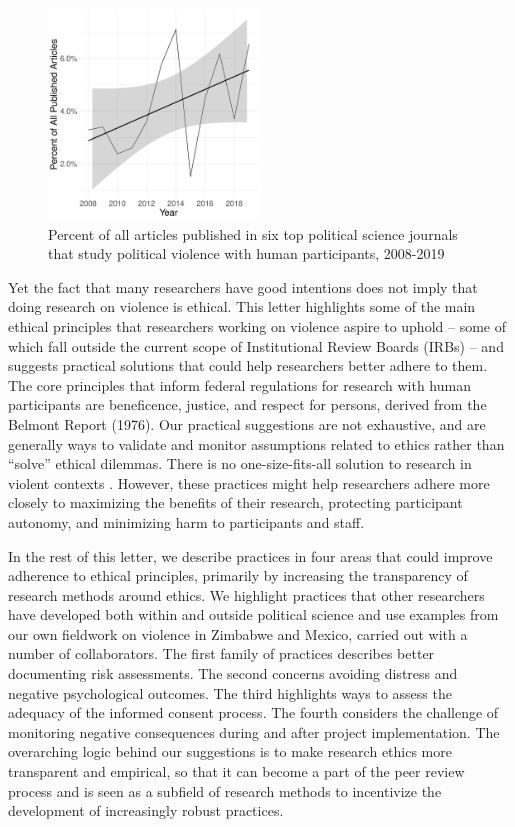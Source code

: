 \documentclass[
  journal=psrm,
  manuscript=research-note,  %
  year=2022,
  volume=6,
]{cup-journal}
\begin{document}
\begin{figure}[hbt!]
    \centering
    \includegraphics[width=0.5\textwidth]{ViolPct_Year.pdf}
    \caption{Percent of all articles published in six top political science journals that study political violence with human participants, 2008-2019}
    \label{fig:pct_violence}
\end{figure}

Yet the fact that many researchers have good intentions does not imply that doing research on violence is ethical. This letter highlights some of the main ethical principles that researchers working on violence aspire to uphold -- some of which fall outside the current scope of Institutional Review Boards (IRBs) -- and suggests practical solutions that could help researchers better adhere to them. The core principles that inform federal regulations for research with human participants are beneficence, justice, and respect for persons, derived from the Belmont Report (1976). Our practical suggestions are not exhaustive, and are generally ways to validate and monitor assumptions related to ethics rather than ``solve'' ethical dilemmas. There is no one-size-fits-all solution to research in violent contexts \citep{wood2006ethical}. However, these practices might help researchers adhere more closely to maximizing the benefits of their research, protecting participant autonomy, and minimizing harm to participants and staff. 

In the rest of this letter, we describe practices in four areas that could improve adherence to ethical principles, primarily by increasing the transparency of research methods around ethics. We highlight practices that other researchers have developed both within and outside political science and use examples from our own fieldwork on violence in Zimbabwe and Mexico, carried out with a number of collaborators. 
The first family of practices describes better documenting risk assessments. The second concerns avoiding distress and negative psychological outcomes. The third highlights ways to assess the adequacy of the informed consent process. The fourth considers the challenge of monitoring negative consequences during and after project implementation. The overarching logic behind our suggestions is to make research ethics more transparent and empirical, so that it can become a part of the peer review process and is seen as a subfield of research methods to incentivize the development of increasingly robust practices.






\printbibliography

\appendix


\end{document}
